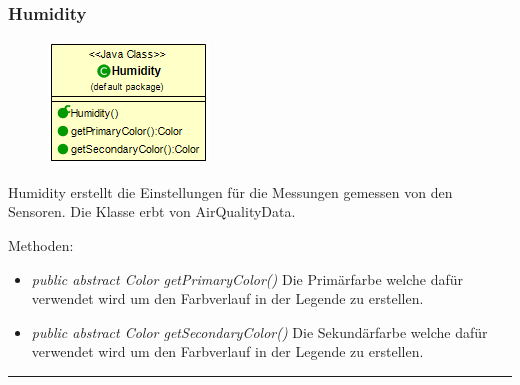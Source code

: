 \subsubsection{Humidity}
\begin{minipage}{0.3\textwidth}
    \begin{figure}[H]
        {\centering\includegraphics[scale = 0.6
        ]{media/view/airquality/Humidity_Class.png}}
    \end{figure}
    \end{minipage} \hfill
    \begin{minipage}{0.6\textwidth}
Humidity erstellt die Einstellungen für die Messungen gemessen von den Sensoren. Die Klasse erbt von AirQualityData.
\end{minipage}
Methoden: \begin{itemize} [noitemsep]
	\item \emph{public abstract Color getPrimaryColor()} Die Primärfarbe welche dafür verwendet wird um den Farbverlauf in der Legende zu erstellen.
	\item \emph{public abstract Color getSecondaryColor()} Die Sekundärfarbe welche dafür verwendet wird um den Farbverlauf in der Legende zu erstellen.
\end{itemize}

\rule{\textwidth}{0.4pt}
